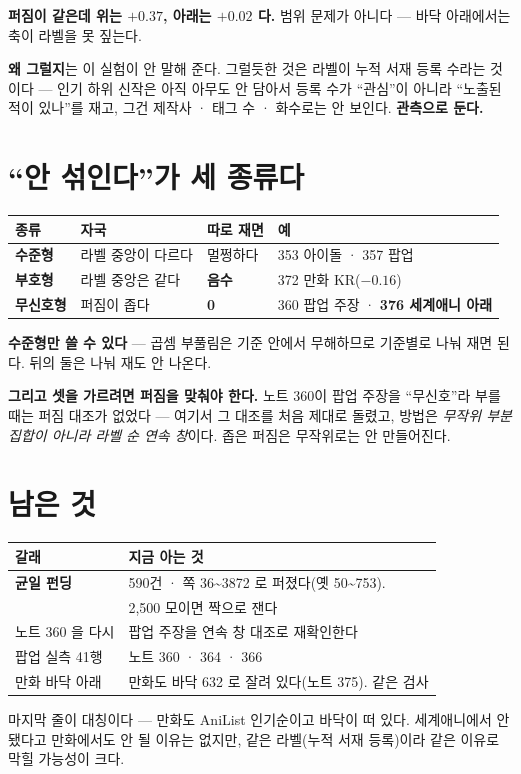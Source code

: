 \documentclass[11pt]{article}
\begin{document}
\textbf{퍼짐이 같은데 위는 $+0.37$, 아래는 $+0.02$ 다.} 범위 문제가
아니다 --- 바닥 아래에서는 축이 라벨을 못 짚는다.

\textbf{왜 그럴지}는 이 실험이 안 말해 준다. 그럴듯한 것은 라벨이 누적
서재 등록 수라는 것이다 --- 인기 하위 신작은 아직 아무도 안 담아서
등록 수가 ``관심''이 아니라 ``노출된 적이 있나''를 재고, 그건 제작사 ·
태그 수 · 화수로는 안 보인다. \textbf{관측으로 둔다.}

\section{``안 섞인다''가 세 종류다}

\begin{center}
\begin{tabular}{llll}
\hline
종류 & 자국 & 따로 재면 & 예 \\
\hline
\textbf{수준형} & 라벨 중앙이 다르다 & 멀쩡하다 & 353 아이돌 · 357 팝업 \\
\textbf{부호형} & 라벨 중앙은 같다 & \textbf{음수} & 372 만화 KR($-0.16$) \\
\textbf{무신호형} & 퍼짐이 좁다 & \textbf{0} & 360 팝업 주장 · \textbf{376 세계애니 아래} \\
\hline
\end{tabular}
\end{center}

\textbf{수준형만 쓸 수 있다} --- 곱셈 부풀림은 기준 안에서 무해하므로
기준별로 나눠 재면 된다. 뒤의 둘은 나눠 재도 안 나온다.

\textbf{그리고 셋을 가르려면 퍼짐을 맞춰야 한다.} 노트 360이 팝업 주장을
``무신호''라 부를 때는 퍼짐 대조가 없었다 --- 여기서 그 대조를 처음
제대로 돌렸고, 방법은 \emph{무작위 부분집합이 아니라 라벨 순 연속 창}이다.
좁은 퍼짐은 무작위로는 안 만들어진다.

\section{남은 것}

\begin{center}
\begin{tabular}{ll}
\hline
갈래 & 지금 아는 것 \\
\hline
\textbf{균일 펀딩} & 590건 · 쪽 36\textasciitilde{}3872 로 퍼졌다(옛 50\textasciitilde{}753). \\
 & 2,500 모이면 짝으로 잰다 \\
노트 360 을 다시 & 팝업 주장을 연속 창 대조로 재확인한다 \\
팝업 실측 41행 & 노트 360 · 364 · 366 \\
만화 바닥 아래 & 만화도 바닥 632 로 잘려 있다(노트 375). 같은 검사 \\
\hline
\end{tabular}
\end{center}

마지막 줄이 대칭이다 --- 만화도 AniList 인기순이고 바닥이 떠 있다.
세계애니에서 안 됐다고 만화에서도 안 될 이유는 없지만, 같은 라벨(누적
서재 등록)이라 같은 이유로 막힐 가능성이 크다.
\end{document}
